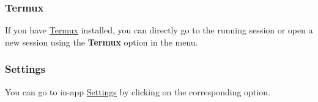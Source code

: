 \subsubsection{Termux}
If you have \href{https://github.com/termux/termux-app}{Termux} installed, you can directly go to the running session
or open a new session using the \textbf{Termux} option in the menu.

\subsubsection{Settings}
You can go to in-app \hyperref[sec:settings-page]{Settings} by clicking on the corresponding option.
